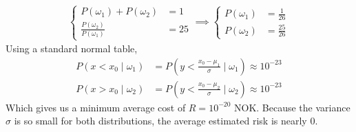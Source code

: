 \documentclass[a4paper, 10pt, twoside]{article}
\begin{document}
\begin{enumerate}[a)]
\begin{align*}
\begin{cases}
                  P(\omega_1)+P(\omega_2)         & = 1  \\
                  \frac{P(\omega_2)}{P(\omega_1)} & = 25
              \end{cases}
              \implies
              \begin{cases}
                  P(\omega_1) & = \frac{1}{26}  \\
                  P(\omega_2) & = \frac{25}{26}
              \end{cases}
          \end{align*}
          Using a standard normal table,
          \begin{align*}
              P(x < x_0 \mid \omega_1) & = P(y < \frac{x_0 - \mu_1}{\sigma} \mid \omega_1) \approx 10^{-23} \\
              P(x > x_0 \mid \omega_2) & = P(y < \frac{x_0 - \mu_2}{\sigma} \mid \omega_2) \approx 10^{-23}
          \end{align*}
          Which gives us a minimum average cost of $R = 10^{-20}$ NOK.
          Because the variance $\sigma$ is so small for both distributions, the average estimated risk is nearly 0.
\end{enumerate}
\end{document}
